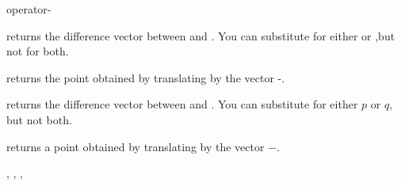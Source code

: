 \begin{ccRefFunction}{operator-}

       {returns the difference vector between  and . 
        You can substitute  for either  or 
        ,but not for both.}

       {returns the point obtained by translating  by the 
        vector -.}

       {returns the difference vector between  and .
        You can substitute  for either $p$
	or $q$, but not both.}

       {returns a point obtained by translating  by the 
        vector $-$.}

\ccSeeAlso

, , , 

\end{ccRefFunction}

